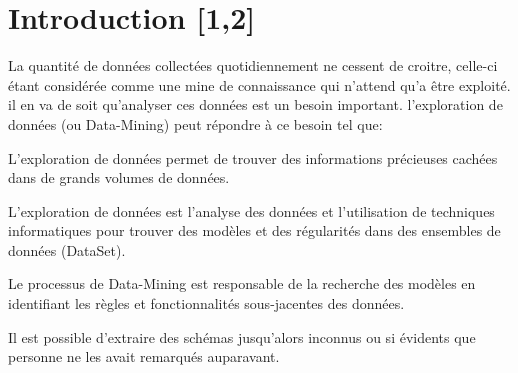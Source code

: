 \documentclass[12pt,a4paper,oneside]{book}
\begin{document}
	
	\def\reportnumber{}
	\def\reporttitle{Implémentation de Techniques de Data-Mining }
	
	
	
	\sffamily
	
	\setcounter{tocdepth}{2}
	\tableofcontents
	\listoffigures
	\newpage
	
	\chapter*{Introduction [1,2] }
	
	La quantité de données collectées quotidiennement ne cessent de croitre, celle-ci étant considérée comme une mine de connaissance qui n'attend qu'a être exploité. il en va de soit qu'analyser ces données
	est un besoin important. l'exploration de données (ou Data-Mining) peut répondre à ce besoin tel que:
	
	L'exploration de données permet de trouver des informations précieuses cachées dans de grands volumes de données.
	
	L'exploration de données est l'analyse des données et l'utilisation de techniques informatiques pour trouver des modèles et des régularités dans des ensembles de données (DataSet).
	
	Le processus de Data-Mining est responsable de la recherche des modèles en identifiant les règles et fonctionnalités sous-jacentes des données.
	
	Il est possible d'extraire des schémas jusqu'alors inconnus ou si évidents que personne ne les avait remarqués auparavant.
	
\end{document}
